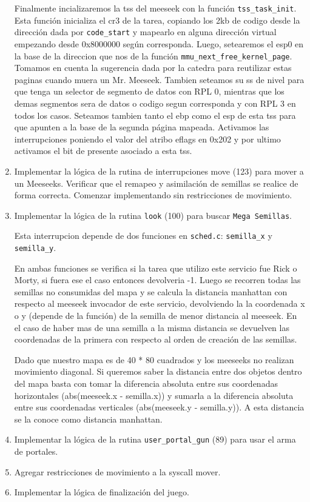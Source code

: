 \documentclass[a4paper]{article}
\begin{document}
\begin{enumerate}
	Finalmente incializaremos la tss del meeseek con la funci\'on \texttt{tss\_task\_init}. Esta funci\'on inicializa el cr3 de la tarea, copiando los 2kb de codigo desde la direcci\'on dada por \texttt{code\_start} y mapearlo en alguna direcci\'on virtual empezando desde 0x8000000 seg\'un corresponda. Luego, setearemos el esp0 en la base de la direccion que nos de la funci\'on \texttt{mmu\_next\_free\_kernel\_page}. Tomamos en cuenta la sugerencia dada por la catedra para reutilizar estas paginas cuando muera un Mr. Meeseek. Tambien seteamos su ss de nivel para que tenga un selector de segmento de datos con RPL 0, mientras que los demas segmentos sera de datos o codigo segun corresponda y con RPL 3 en todos los casos. Seteamos tambien tanto el ebp como el esp de esta tss para que apunten a la base de la segunda p\'agina mapeada. Activamos las interrupciones poniendo el valor del atribo eflags en 0x202 y por ultimo activamos el bit de presente asociado a esta tss.
	
	\item Implementar la lógica de la rutina de interrupciones move (123) para mover a un Meeseeks. Verificar que el remapeo y asimilación de semillas se realice de forma correcta. Comenzar implementando sin restricciones de movimiento.
	
	\item Implementar la lógica de la rutina \texttt{look} (100) para buscar \texttt{Mega Semillas}.
	
	Esta interrupcion depende de dos funciones en \texttt{sched.c}: \texttt{semilla\_x} y \texttt{semilla\_y}.
	
	
	En ambas funciones se verifica si la tarea que utilizo este servicio fue Rick o Morty, si fuera ese el caso entonces devolveria -1. Luego se recorren todas las semillas no consumidas del mapa y se calcula la distancia manhattan con respecto al meeseek invocador de este servicio, devolviendo la la coordenada x o y (depende de la funci\'on) de la semilla de menor distancia al meeseek.
	En el caso de haber mas de una semilla a la misma distancia se devuelven las coordenadas de la primera con respecto al orden de creación de las semillas.
	
	Dado que nuestro mapa es de 40 * 80 cuadrados y los meeseeks no realizan movimiento diagonal. Si queremos saber la distancia entre dos objetos dentro del mapa basta con tomar la diferencia absoluta entre sus coordenadas horizontales (abs(meeseek.x - semilla.x)) y sumarla a la diferencia absoluta entre sus coordenadas verticales (abs(meeseek.y - semilla.y)). A esta distancia se la conoce como distancia manhattan.
	
	\item Implementar la lógica de la rutina \texttt{user\_portal\_gun} (89) para usar el arma de portales.
	
	\item Agregar restricciones de movimiento a la syscall mover.
	
	\item Implementar la lógica de finalización del juego.
	
\end{enumerate}
\end{document}
